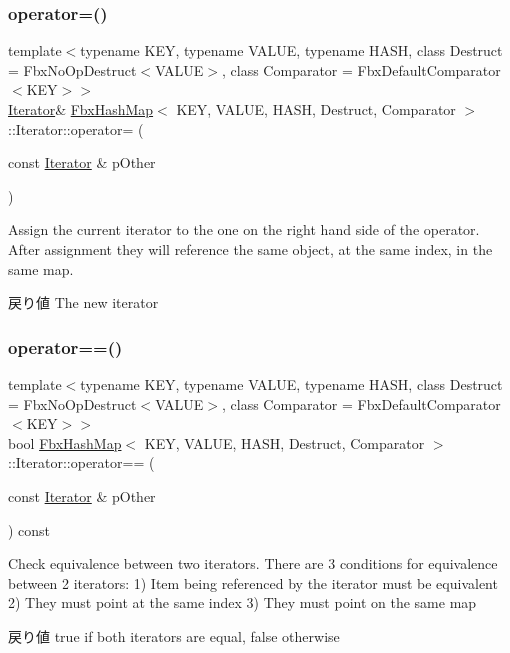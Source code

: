 \subsubsection{\texorpdfstring{operator=()}{operator=()}}
{\footnotesize\ttfamily template$<$typename K\+EY, typename V\+A\+L\+UE, typename H\+A\+SH, class Destruct = Fbx\+No\+Op\+Destruct$<$\+V\+A\+L\+U\+E$>$, class Comparator = Fbx\+Default\+Comparator$<$\+K\+E\+Y$>$$>$ \\
\hyperlink{class_fbx_hash_map_1_1_iterator}{Iterator}\& \hyperlink{class_fbx_hash_map}{Fbx\+Hash\+Map}$<$ K\+EY, V\+A\+L\+UE, H\+A\+SH, Destruct, Comparator $>$\+::Iterator\+::operator= (\begin{DoxyParamCaption}\item[{const \hyperlink{class_fbx_hash_map_1_1_iterator}{Iterator} \&}]{p\+Other }\end{DoxyParamCaption})}

Assign the current iterator to the one on the right hand side of the operator. After assignment they will reference the same object, at the same index, in the same map. \begin{DoxyReturn}{戻り値}
The new iterator 
\end{DoxyReturn}
\mbox{\label{class_fbx_hash_map_1_1_iterator_aeeba00ddc25c531558c29608ef10d478}} 
\subsubsection{\texorpdfstring{operator==()}{operator==()}}
{\footnotesize\ttfamily template$<$typename K\+EY, typename V\+A\+L\+UE, typename H\+A\+SH, class Destruct = Fbx\+No\+Op\+Destruct$<$\+V\+A\+L\+U\+E$>$, class Comparator = Fbx\+Default\+Comparator$<$\+K\+E\+Y$>$$>$ \\
bool \hyperlink{class_fbx_hash_map}{Fbx\+Hash\+Map}$<$ K\+EY, V\+A\+L\+UE, H\+A\+SH, Destruct, Comparator $>$\+::Iterator\+::operator== (\begin{DoxyParamCaption}\item[{const \hyperlink{class_fbx_hash_map_1_1_iterator}{Iterator} \&}]{p\+Other }\end{DoxyParamCaption}) const}

Check equivalence between two iterators. There are 3 conditions for equivalence between 2 iterators\+: 1) Item being referenced by the iterator must be equivalent 2) They must point at the same index 3) They must point on the same map \begin{DoxyReturn}{戻り値}
true if both iterators are equal, false otherwise 
\end{DoxyReturn}


